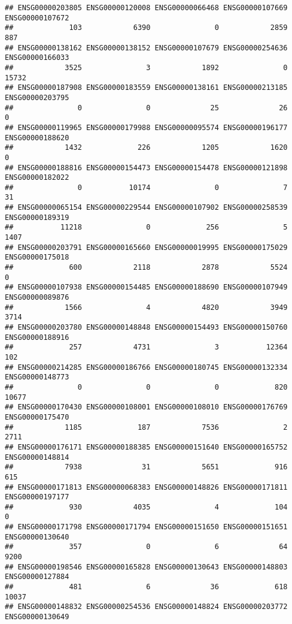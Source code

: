 \documentclass[
]{article}
\begin{document}
\begin{verbatim}
## ENSG00000203805 ENSG00000120008 ENSG00000066468 ENSG00000107669 ENSG00000107672 
##             103            6390               0            2859             887 
## ENSG00000138162 ENSG00000138152 ENSG00000107679 ENSG00000254636 ENSG00000166033 
##            3525               3            1892               0           15732 
## ENSG00000187908 ENSG00000183559 ENSG00000138161 ENSG00000213185 ENSG00000203795 
##               0               0              25              26               0 
## ENSG00000119965 ENSG00000179988 ENSG00000095574 ENSG00000196177 ENSG00000188620 
##            1432             226            1205            1620               0 
## ENSG00000188816 ENSG00000154473 ENSG00000154478 ENSG00000121898 ENSG00000182022 
##               0           10174               0               7              31 
## ENSG00000065154 ENSG00000229544 ENSG00000107902 ENSG00000258539 ENSG00000189319 
##           11218               0             256               5            1407 
## ENSG00000203791 ENSG00000165660 ENSG00000019995 ENSG00000175029 ENSG00000175018 
##             600            2118            2878            5524               0 
## ENSG00000107938 ENSG00000154485 ENSG00000188690 ENSG00000107949 ENSG00000089876 
##            1566               4            4820            3949            3714 
## ENSG00000203780 ENSG00000148848 ENSG00000154493 ENSG00000150760 ENSG00000188916 
##             257            4731               3           12364             102 
## ENSG00000214285 ENSG00000186766 ENSG00000180745 ENSG00000132334 ENSG00000148773 
##               0               0               0             820           10677 
## ENSG00000170430 ENSG00000108001 ENSG00000108010 ENSG00000176769 ENSG00000175470 
##            1185             187            7536               2            2711 
## ENSG00000176171 ENSG00000188385 ENSG00000151640 ENSG00000165752 ENSG00000148814 
##            7938              31            5651             916             615 
## ENSG00000171813 ENSG00000068383 ENSG00000148826 ENSG00000171811 ENSG00000197177 
##             930            4035               4             104               0 
## ENSG00000171798 ENSG00000171794 ENSG00000151650 ENSG00000151651 ENSG00000130640 
##             357               0               6              64            9200 
## ENSG00000198546 ENSG00000165828 ENSG00000130643 ENSG00000148803 ENSG00000127884 
##             481               6              36             618           10037 
## ENSG00000148832 ENSG00000254536 ENSG00000148824 ENSG00000203772 ENSG00000130649 

\end{verbatim}
\end{document}
